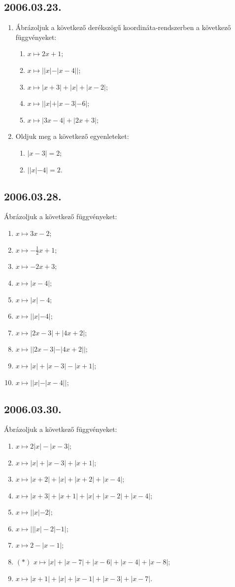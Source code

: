 \documentclass{article}
\newenvironment{abc}{\begin{enumerate}[label=\textit{\alph*})]}{\end{enumerate}}
\begin{document}
\subsection*{2006.03.23.}
\begin{enumerate}
\item Ábrázoljuk a következő derékszögű koordináta-rendszerben a következő függvényeket:
\begin{abc}
\item $x \mapsto 2x+1$;
\item $x \mapsto ||x|-|x-4||$;
\item $x \mapsto |x+3|+|x|+|x-2|$;
\item $x \mapsto ||x|+|x-3|-6|$;
\item $x \mapsto |3x-4|+|2x+3|$;
\end{abc}
\item Oldjuk meg a következő egyenleteket:
\begin{abc}
\item $|x-3|=2$;
\item $||x|-4|=2$.
\end{abc}
\end{enumerate}

\subsection*{2006.03.28.}
Ábrázoljuk a következő függvényeket:
\begin{enumerate}
\item $x \mapsto 3x-2$;
\item $x \mapsto -\frac{1}{2}x+1$;
\item $x \mapsto -2x+3$;
\item $x \mapsto |x-4|$;
\item $x \mapsto |x|-4$;
\item $x \mapsto ||x|-4|$;
\item $x \mapsto |2x-3|+|4x+2|$;
\item $x \mapsto ||2x-3|-|4x+2||$;
\item $x \mapsto |x|+|x-3|-|x+1|$;
\item $x \mapsto ||x|-|x-4||$;
\end{enumerate}

\subsection*{2006.03.30.}
Ábrázoljuk a következő függvényeket:
\begin{enumerate}
\item $x \mapsto 2|x|-|x-3|$;
\item $x \mapsto |x|+|x-3|+|x+1|$;
\item $x \mapsto |x+2|+|x|+|x+2|+|x-4|$;
\item $x \mapsto |x+3|+|x+1|+|x|+|x-2|+|x-4|$;
\item $x \mapsto ||x|-2|$;
\item $x \mapsto |||x|-2|-1|$;
\item $x \mapsto 2-|x-1|$;
\item $(*)$ $ x \mapsto |x|+|x-7|+|x-6|+|x-4|+|x-8|$;
\item $x \mapsto |x+1|+|x|+|x-1|+|x-3|+|x-7|$.
\end{enumerate}
\end{document}
